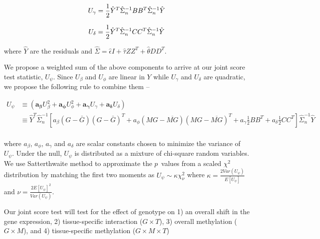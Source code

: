 \documentclass[hidelinks]{article}
\begin{document}
\begingroup
\large
\begin{equation*}
U_\gamma = \frac{1}{2} \hat{Y}^T \hat{\Sigma}_n^{-1} BB^T \hat{\Sigma}_n^{-1} \hat{Y} \\
\end{equation*}
\endgroup

\begingroup
\large
\begin{equation*}
U_\delta = \frac{1}{2} \hat{Y}^T \hat{\Sigma}_n^{-1} CC^T \hat{\Sigma}_n^{-1} \hat{Y}\\
\end{equation*}
\endgroup

where $\hat{Y}$ are the residuals and $\hat{\Sigma} = \hat{\epsilon} I + \hat{\tau}ZZ^T + \hat{\theta}DD^T$.

We propose a weighted sum of the above components to arrive at our joint score test statistic, $U_\psi$. Since $U_\beta$ and $U_\phi$ are linear in $Y$ while $U_\gamma$ and $U_\delta$ are quadratic, we propose the following rule to combine them --	

\begingroup
\large
\begin{equation}
\begin{split}
U_\psi &\equiv  \left( \boldsymbol{a_\beta} U^2_\beta + \boldsymbol{a_\phi} U^2_\phi + \boldsymbol{a_\gamma} U_\gamma + \boldsymbol{a_\delta} U_\delta  \right) \\
 &\equiv \hat{Y}^T  \hat{\Sigma}_n^{-1} \left[ a_\beta \left(G - \bar{G}\right) \left(G - \bar{G}\right)^T  + a_\phi \left(MG - \overline{MG}\right) \left(MG - \overline{MG}\right)^T  + a_\gamma \frac{1}{2} B B^T + a_\delta \frac{1}{2} C C^T  \right]  \hat{\Sigma}_n^{-1} \hat{Y} \\
\end{split}
\end{equation}
\endgroup

where $a_\beta$, $a_\phi$, $a_\gamma$ and $a_\delta$ are scalar constants chosen to minimize the variance of $U_\psi$. Under the null, $U_\psi$ is distributed as a mixture of chi-square random variables. We use Satterthwaite method \cite{satterthwaite} to approximate the $p$~values from a scaled $\chi^2$ distribution by matching the first two moments as $U_\psi \sim \kappa \chi^2_{\nu}$ where $\kappa = \frac{2 Var(U_\psi)}{E[U_\psi]}$ and $\nu = \frac{2 E[U_\psi]^2}{Var(U_\psi)}$. 

Our joint score test will test for the effect of genotype on 1) an overall shift in the gene expression, 2) tissue-specific interaction ($G \times T$), 3) overall methylation ($G \times M$), and 4) tissue-specific methylation ($G \times M \times T$)
\end{document}
